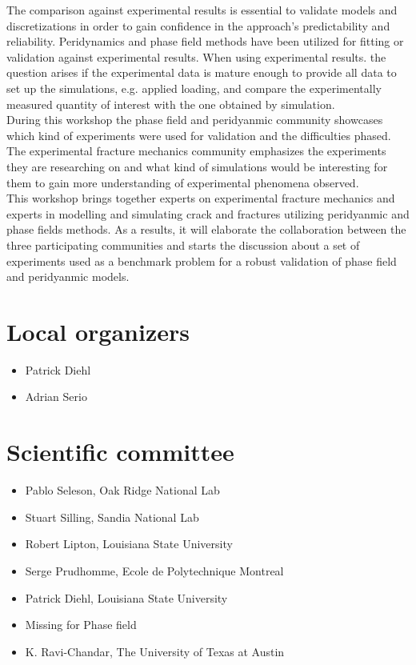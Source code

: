 The comparison against experimental results is essential to validate models and discretizations in order to gain confidence in the approach’s predictability and reliability. Peridynamics and phase field methods have been utilized for fitting or validation against experimental results. When using experimental results. the question arises if the experimental data is mature enough to provide all data to set up the simulations, e.g. applied loading, and compare the experimentally measured quantity of interest with the one obtained by simulation. \\

During this workshop the phase field and peridyanmic community showcases which kind of experiments were used for validation and the difficulties phased. The experimental fracture mechanics community emphasizes the experiments they are researching on and what kind of simulations would be interesting for them to gain more understanding of experimental phenomena observed. \\

This workshop brings together experts on experimental fracture mechanics and experts in modelling and simulating crack and fractures utilizing peridyanmic and phase fields methods. As a results, it will elaborate the collaboration between the three participating communities and starts the discussion about a set of experiments used as a benchmark problem for a robust validation of phase field and peridyanmic models.




\section*{Local organizers}
\begin{itemize}
    \item Patrick Diehl
    \item Adrian Serio
\end{itemize}

\section*{Scientific committee}
\begin{itemize}
\item Pablo Seleson, Oak Ridge National Lab
\item Stuart Silling, Sandia National Lab
\item Robert Lipton, Louisiana State University
\item Serge Prudhomme, Ecole de Polytechnique Montreal
\item Patrick Diehl, Louisiana State University
\item Missing for Phase field 
\item K. Ravi-Chandar, The University of Texas at Austin
\end{itemize}
